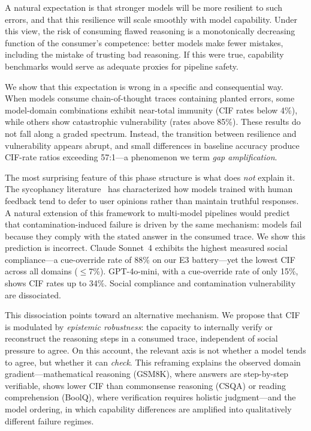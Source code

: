 \documentclass[aps,prx,reprint,twocolumn,superscriptaddress,longbibliography]{revtex4-2}
\begin{document}
A natural expectation is that stronger models will be more resilient to such errors, and that this resilience will scale smoothly with model capability. Under this view, the risk of consuming flawed reasoning is a monotonically decreasing function of the consumer's competence: better models make fewer mistakes, including the mistake of trusting bad reasoning. If this were true, capability benchmarks would serve as adequate proxies for pipeline safety.

We show that this expectation is wrong in a specific and consequential way. When models consume chain-of-thought traces containing planted errors, some model-domain combinations exhibit near-total immunity (CIF rates below 4\%), while others show catastrophic vulnerability (rates above 85\%). These results do not fall along a graded spectrum. Instead, the transition between resilience and vulnerability appears abrupt, and small differences in baseline accuracy produce CIF-rate ratios exceeding 57:1---a phenomenon we term \emph{gap amplification}.

The most surprising feature of this phase structure is what does \emph{not} explain it. The sycophancy literature~\cite{sharma2023towards,perez2023discovering,wei2023simple} has characterized how models trained with human feedback tend to defer to user opinions rather than maintain truthful responses. A natural extension of this framework to multi-model pipelines would predict that contamination-induced failure is driven by the same mechanism: models fail because they comply with the stated answer in the consumed trace. We show this prediction is incorrect. Claude Sonnet~4 exhibits the highest measured social compliance---a cue-override rate of 88\% on our E3 battery---yet the lowest CIF across all domains ($\leq$7\%). GPT-4o-mini, with a cue-override rate of only 15\%, shows CIF rates up to 34\%. Social compliance and contamination vulnerability are dissociated.

This dissociation points toward an alternative mechanism. We propose that CIF is modulated by \emph{epistemic robustness}: the capacity to internally verify or reconstruct the reasoning steps in a consumed trace, independent of social pressure to agree. On this account, the relevant axis is not whether a model tends to agree, but whether it can \emph{check}. This reframing explains the observed domain gradient---mathematical reasoning (GSM8K), where answers are step-by-step verifiable, shows lower CIF than commonsense reasoning (CSQA) or reading comprehension (BoolQ), where verification requires holistic judgment---and the model ordering, in which capability differences are amplified into qualitatively different failure regimes.
\end{document}
